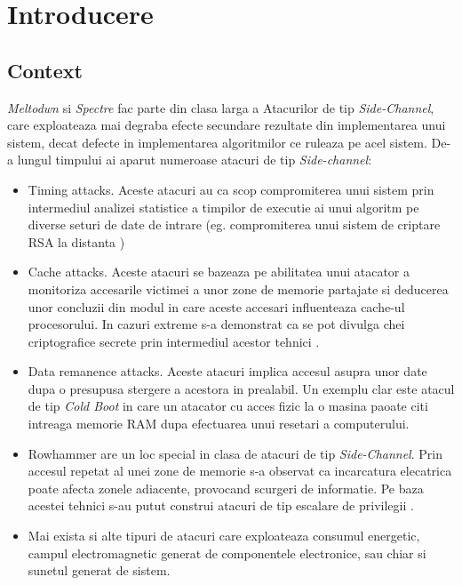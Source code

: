 \chapter{Introducere}

\section{Context}

\emph{Meltodwn} si \emph{Spectre} fac parte din clasa larga a Atacurilor de tip
\emph{Side-Channel}, care exploateaza mai degraba efecte secundare rezultate
din implementarea unui sistem, decat defecte in implementarea algoritmilor ce
ruleaza pe acel sistem. De-a lungul timpului ai aparut numeroase atacuri de tip
\emph{Side-channel}:

\begin{itemize}
  \item Timing attacks. Aceste atacuri au ca scop compromiterea unui sistem prin
    intermediul analizei statistice a timpilor de executie ai unui algoritm pe   
    diverse seturi de date de intrare (eg. compromiterea unui sistem de criptare
    RSA la distanta \cite{timing_practical})
  \item Cache attacks. Aceste atacuri se bazeaza pe abilitatea unui atacator
    a monitoriza accesarile victimei a unor zone de memorie partajate si deducerea
    unor concluzii din modul in care aceste accesari influenteaza cache-ul 
    procesorului. In cazuri extreme s-a demonstrat ca se pot divulga chei criptografice 
    secrete prin intermediul acestor tehnici \cite{percival2005cache}.
  \item Data remanence attacks. Aceste atacuri implica accesul asupra unor date
    dupa o presupusa stergere a acestora in prealabil. Un exemplu clar este 
    atacul de tip \emph{Cold Boot} \cite{cold_boot} in care un atacator cu
    acces fizic la o masina paoate citi intreaga memorie RAM dupa efectuarea
    unui resetari a computerului.
  \item Rowhammer are un loc special in clasa de atacuri de tip \emph{Side-Channel}. 
    Prin accesul repetat al unei zone de memorie s-a observat ca incarcatura elecatrica
    poate afecta zonele adiacente, provocand scurgeri de informatie. Pe baza acestei
    tehnici s-au putut construi atacuri de tip escalare de privilegii \cite{rowhammer}.
  \item Mai exista si alte tipuri de atacuri care exploateaza consumul energetic,
    campul electromagnetic generat de componentele electronice, sau chiar si sunetul
    generat de sistem.
\end{itemize}

